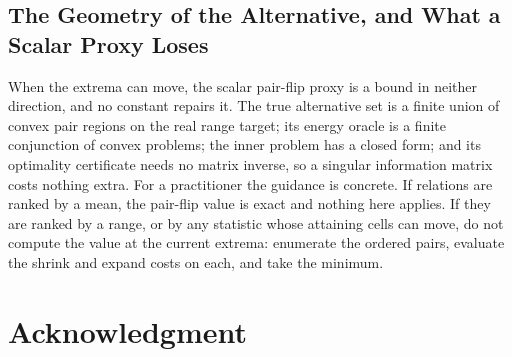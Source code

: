 \subsection{The Geometry of the Alternative, and What a Scalar Proxy Loses}

When the extrema can move, the scalar pair-flip proxy is a bound in neither direction, and no
constant repairs it. The true alternative set is a finite union of convex pair regions on the
real range target; its energy oracle is a finite conjunction of convex problems; the inner
problem has a closed form; and its optimality certificate needs no matrix inverse, so a
singular information matrix costs nothing extra. For a practitioner the guidance is concrete.
If relations are ranked by a mean, the pair-flip value is exact and nothing here applies. If
they are ranked by a range, or by any statistic whose attaining cells can move, do not compute
the value at the current extrema: enumerate the ordered pairs, evaluate the shrink and expand
costs on each, and take the minimum.



\section*{Acknowledgment}

